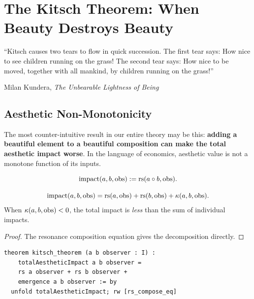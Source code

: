 \chapter{The Kitsch Theorem: When Beauty Destroys Beauty}
\label{ch:kitsch}

\epigraph{``Kitsch causes two tears to flow in quick succession.
The first tear says: How nice to see children running on the grass!
The second tear says: How nice to be moved, together with all mankind,
by children running on the grass!''}{Milan Kundera, \textit{The Unbearable Lightness of Being}}

\section{Aesthetic Non-Monotonicity}

The most counter-intuitive result in our entire theory may be this:
\textbf{adding a beautiful element to a beautiful composition can make
the total aesthetic impact worse}.  In the language of economics, aesthetic
value is not a monotone function of its inputs.

\begin{definition}
\[
  \mathrm{impact}(a, b, \mathrm{obs}) := \mathrm{rs}(a \circ b, \mathrm{obs}).
\]
\end{definition}

\begin{theorem}
\label{thm:kitsch}
\[
  \mathrm{impact}(a, b, \mathrm{obs})
  = \mathrm{rs}(a, \mathrm{obs}) + \mathrm{rs}(b, \mathrm{obs}) + \kappa(a, b, \mathrm{obs}).
\]
When $\kappa(a, b, \mathrm{obs}) < 0$, the total impact is \emph{less}
than the sum of individual impacts.
\end{theorem}

\begin{proof}
The resonance composition equation gives the decomposition directly.
\end{proof}

\begin{lstlisting}
theorem kitsch_theorem (a b observer : I) :
    totalAestheticImpact a b observer =
    rs a observer + rs b observer +
    emergence a b observer := by
  unfold totalAestheticImpact; rw [rs_compose_eq]
\end{lstlisting}


